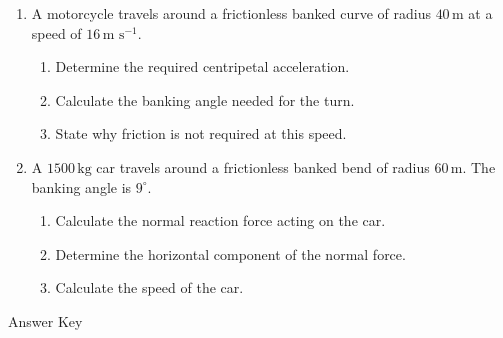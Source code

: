 \documentclass[12pt]{article}
\begin{document}
\begin{enumerate}[label=\textbf{\arabic*.}, itemsep=2em]
\item
A motorcycle travels around a frictionless banked curve of radius \(40\,\text{m}\) at a speed of \(16\,\text{m s}^{-1}\).

\begin{enumerate}[label=(\alph*)]
    \item Determine the required centripetal acceleration.
    \item Calculate the banking angle needed for the turn.
    \item State why friction is not required at this speed.
\end{enumerate}

\item
A \(1500\,\text{kg}\) car travels around a frictionless banked bend of radius \(60\,\text{m}\). The banking angle is \(9^\circ\).

\begin{enumerate}[label=(\alph*)]
    \item Calculate the normal reaction force acting on the car.
    \item Determine the horizontal component of the normal force.
    \item Calculate the speed of the car.
\end{enumerate}

\end{enumerate}

\newpage

\begin{center}
    {\LARGE Answer Key}
\end{center}

\vspace{1em}
\end{document}

